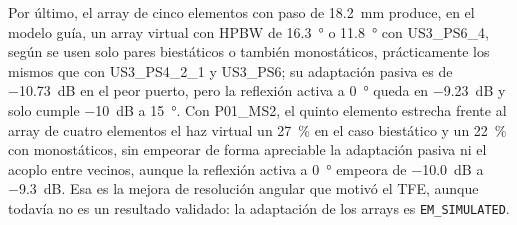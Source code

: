 \documentclass[11pt,a4paper]{article}
\begin{document}
Por último, el array de cinco elementos con paso de \SI{18.2}{mm} produce, en el modelo guía, un array virtual con HPBW de \SI{16.3}{\degree} o \SI{11.8}{\degree} con US3\_PS6\_4, según se usen solo pares biestáticos o también monostáticos, prácticamente los mismos que con US3\_PS4\_2\_1 y US3\_PS6; su adaptación pasiva es de \SI{-10.73}{dB} en el peor puerto, pero la reflexión activa a \SI{0}{\degree} queda en \SI{-9.23}{dB} y solo cumple \SI{-10}{dB} a \SI{15}{\degree}. Con P01\_MS2, el quinto elemento estrecha frente al array de cuatro elementos el haz virtual un \SI{27}{\percent} en el caso biestático y un \SI{22}{\percent} con monostáticos, sin empeorar de forma apreciable la adaptación pasiva ni el acoplo entre vecinos, aunque la reflexión activa a \SI{0}{\degree} empeora de \SI{-10.0}{dB} a \SI{-9.3}{dB}. Esa es la mejora de resolución angular que motivó el TFE, aunque todavía no es un resultado validado: la adaptación de los arrays es \texttt{EM\_SIMULATED}.
\end{document}
